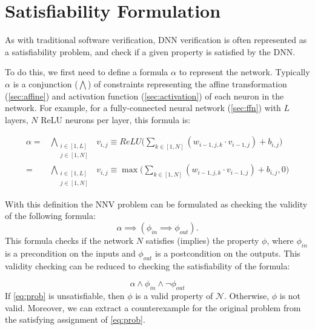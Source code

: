 \documentclass[oneside,11pt,dvipsnames]{book}
\numberwithin{equation}{section}
\theoremstyle{definition}
\theoremstyle{remark}
\begin{document}
\section{Satisfiability Formulation}\label{sec:satisfiability-and-activation-pattern-search}

As with traditional software verification, DNN verification is often represented as a satisfiability problem, and check if a given property is satisfied by the DNN. 

To do this, we first need to define a formula $\alpha$ to represent the network. Typically $\alpha$ is a conjunction ($\bigwedge$) of constraints representing the affine transformation (\autoref{sec:affine}) and activation function (\autoref{sec:activation}) of each neuron in the network.
For example, for a fully-connected neural network (\autoref{sec:ffn}) with $L$ layers, $N$ ReLU neurons per layer, this formula is:

\begin{align*}
\alpha = &\bigwedge_{\begin{smallmatrix}i \in [1,L]\\ j \in [1,N]\end{smallmatrix}}~~v_{i,j} \equiv ReLU \Big( \sum_{k \in [1,N]} (w_{i-1,j,k} \cdot v_{i-1,j}) + b_{i,j}\Big)    \\
 = &\bigwedge_{\begin{smallmatrix}i \in [1,L]\\ j \in [1,N]\end{smallmatrix}}~~v_{i,j} \equiv \max \Big( \sum_{k \in [1,N]} (w_{i-1,j,k} \cdot v_{i-1,j}) + b_{i,j}, 0 \Big)
\end{align*}

With this definition the NNV problem can be formulated as checking the validity of the following formula:
\begin{equation}\label{eq:nnv}
    \alpha \implies (\phi_{in} \implies \phi_{out}).
\end{equation}
This formula checks if the network $N$ satisfies (implies) the property $\phi$, where $\phi_{in}$ is a precondition on the inputs and $\phi_{out}$ is a postcondition on the outputs. This validity checking can be reduced to checking the satisfiability of the formula:

\begin{equation}\label{eq:prob}
  \alpha \land \phi_{in} \land \neg \phi_{out}
\end{equation}
If \autoref{eq:prob} is unsatisfiable, then $\phi$ is a valid property of $\mathcal{N}$. Otherwise, $\phi$ is not valid.  Moreover, we can extract a counterexample for the original problem from the satisfying assignment of \autoref{eq:prob}.
\end{document}

